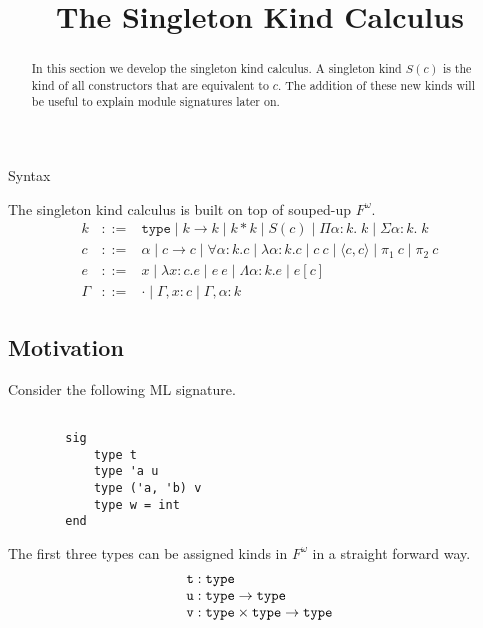 \documentclass{amsart}
\title{The Singleton Kind Calculus}
\newcommand{\type}{\ensuremath{\mathtt{type}}}
\begin{document}
\maketitle

\begin{abstract}
    In this section we develop the singleton kind calculus. A singleton kind $S(c)$ is the kind of all constructors that are equivalent to $c$. The addition of these new kinds will be useful to explain module signatures later on.
\end{abstract}

\begin{section}{Syntax}
    
    The singleton kind calculus is built on top of souped-up $F^\omega$.
    \[
      \begin{array}{lcl}
        k & ::= & \type \mid k \to k \mid k * k \mid S(c) \mid \Pi \alpha : k. \; k \mid \Sigma \alpha : k. \; k\\
        c & ::= & \alpha \mid c \to c \mid \forall \alpha : k. c
            \mid \lambda \alpha : k. c \mid c\ c \mid \langle c, c \rangle \mid \pi_1 \ c \mid \pi_2 \ c \\
        e & ::= & x \mid \lambda x : c. e \mid e\ e \mid
                \Lambda \alpha : k. e \mid e[c]\\
        \Gamma & ::= & \cdot \mid \Gamma, x : c \mid \Gamma, \alpha : k
      \end{array}
    \]

    \section{Motivation}

    Consider the following ML signature.
    \begin{verbatim}

        sig
            type t
            type 'a u
            type ('a, 'b) v
            type w = int
        end
    \end{verbatim}

    The first three types can be assigned kinds in $F^\omega$ in a straight forward way.
        \[
            \begin{array}{l}
                \verb|t| : \type \\
                \verb|u| : \type \to \type \\
                \verb|v| : \type \times \type \to \type
            \end{array}
        \]


\end{section}
\end{document}
